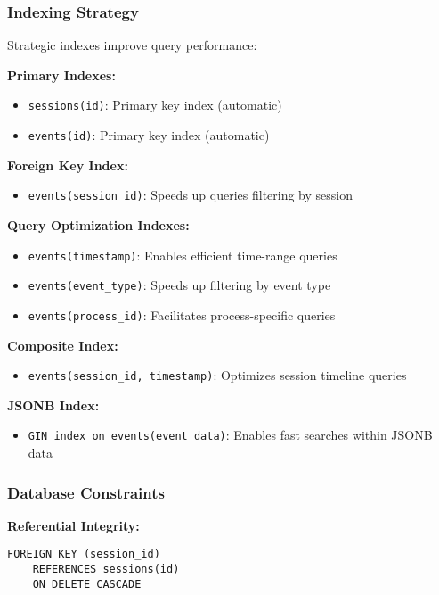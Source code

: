 \subsubsection{Indexing Strategy}

Strategic indexes improve query performance:

\textbf{Primary Indexes:}
\begin{itemize}
    \item \texttt{sessions(id)}: Primary key index (automatic)
    \item \texttt{events(id)}: Primary key index (automatic)
\end{itemize}

\textbf{Foreign Key Index:}
\begin{itemize}
    \item \texttt{events(session\_id)}: Speeds up queries filtering by session
\end{itemize}

\textbf{Query Optimization Indexes:}
\begin{itemize}
    \item \texttt{events(timestamp)}: Enables efficient time-range queries
    \item \texttt{events(event\_type)}: Speeds up filtering by event type
    \item \texttt{events(process\_id)}: Facilitates process-specific queries
\end{itemize}

\textbf{Composite Index:}
\begin{itemize}
    \item \texttt{events(session\_id, timestamp)}: Optimizes session timeline queries
\end{itemize}

\textbf{JSONB Index:}
\begin{itemize}
    \item \texttt{GIN index on events(event\_data)}: Enables fast searches within JSONB data
\end{itemize}

\subsubsection{Database Constraints}

\textbf{Referential Integrity:}
\begin{verbatim}
FOREIGN KEY (session_id) 
    REFERENCES sessions(id) 
    ON DELETE CASCADE
\end{verbatim}

